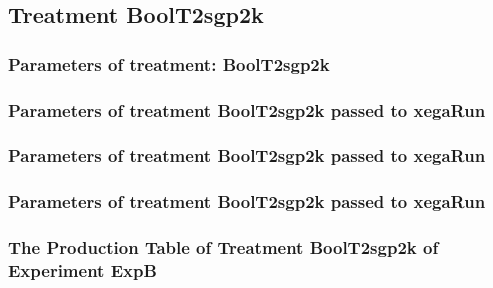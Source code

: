 \documentclass[18pt,c]{beamer}
\makeatletter
\def\beamer@writeslidentry@miniframesoff{%
  \expandafter\beamer@ifempty\expandafter{\beamer@framestartpage}{}%
  {%
   \clearpage\beamer@notesactions%
  }
}
\newcommand*{\miniframesoff}{\let\beamer@writeslidentry=\beamer@writeslidentry@miniframesoff}
\makeatother
\begin{document}
\miniframesoff
\subsection{Treatment BoolT2sgp2k}

 \begin{frame}
 \fontsize{8pt}{9pt}\selectfont
 \frametitle{  Parameters of treatment: BoolT2sgp2k 
 }

 \label{ExpBtParmTable040.tex}  
 \end{frame}


 \begin{frame}
 \fontsize{8pt}{9pt}\selectfont
 \frametitle{  Parameters of treatment BoolT2sgp2k passed to xegaRun
 }

 \label{ExpBtParmTable041.tex}  
 \end{frame}


 \begin{frame}
 \fontsize{8pt}{9pt}\selectfont
 \frametitle{  Parameters of treatment BoolT2sgp2k passed to xegaRun
 }

 \label{ExpBtParmTable042.tex}  
 \end{frame}


 \begin{frame}
 \fontsize{8pt}{9pt}\selectfont
 \frametitle{  Parameters of treatment BoolT2sgp2k passed to xegaRun
 }

 \label{ExpBtParmTable043.tex}  
 \end{frame}

 \begin{frame}
 \fontsize{8pt}{9pt}\selectfont
 \frametitle{ The Production Table of Treatment BoolT2sgp2k of Experiment ExpB }

 \label{ExpBGrammarTable010.tex}  
 \end{frame}
\end{document}
